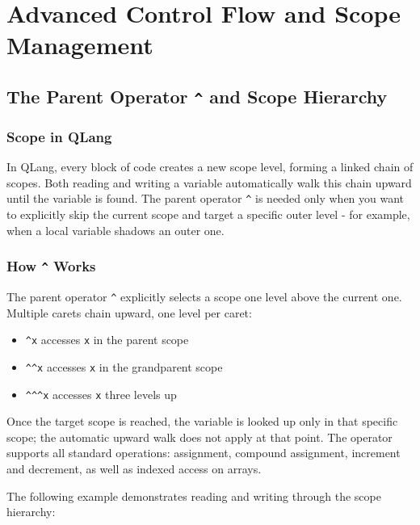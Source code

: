 \section{Advanced Control Flow and Scope Management}
\label{sec:control-flow-and-scope-management}

\subsection{The Parent Operator \texttt{\^{}} and Scope Hierarchy}
\label{sec:parent-operator}

\subsubsection{Scope in QLang}
In QLang, every block of code creates a new scope level, forming a linked chain of
scopes. Both reading and writing a variable automatically walk this chain upward
until the variable is found. The parent operator \texttt{\^{}} is needed only when
you want to explicitly skip the current scope and target a specific outer level
- for example, when a local variable shadows an outer one.


\subsubsection{How \texttt{\^{}} Works}
The parent operator \texttt{\^{}} explicitly selects a scope one level above the current
one. Multiple carets chain upward, one level per caret:

\begin{itemize}
    \item \texttt{\^{}x} accesses \texttt{x} in the parent scope
    \item \texttt{\^{}\^{}x} accesses \texttt{x} in the grandparent scope
    \item \texttt{\^{}\^{}\^{}x} accesses \texttt{x} three levels up
\end{itemize}

Once the target scope is reached, the variable is looked up only in that
specific scope; the automatic upward walk does not apply at that point.
The operator supports all standard operations: assignment, compound assignment,
increment and decrement, as well as indexed access on arrays.

The following example demonstrates reading and writing through the scope hierarchy:


